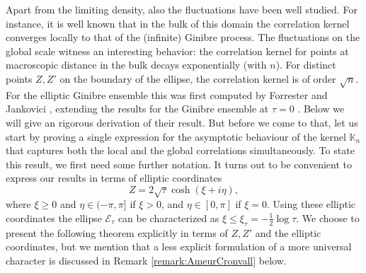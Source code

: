 \documentclass[%
 jmp,
cp,  %
 amsmath,amsthm,amssymb,%
 reprint,%
onecolumn]{revtex4-2}
\begin{document}
Apart from the limiting density, also the fluctuations have been well studied. For instance, it is  well known that in the bulk of this domain the correlation kernel converges locally to that of the (infinite) Ginibre process. The fluctuations on the global scale witness an interesting behavior: the correlation kernel for points at macroscopic distance in the bulk decays exponentially (with $n$). For distinct points $Z, Z'$ on the boundary of the ellipse, the correlation kernel is of order $\sqrt n$. For the elliptic Ginibre ensemble this was first computed by Forrester and Jankovici \cite{FoJa}, extending the results for the Ginibre ensemble at $\tau=0$ \cite{Choquard}. Below we will give an rigorous derivation of their result. 
But before we come to that, let us start by proving a  single expression for the asymptotic behaviour of the kernel $\mathbb K_n$ that captures both the local and the global correlations simultaneously.   To state this result, we  first need some further notation. It turns out to be convenient to express our results in terms of elliptic coordinates 
$$ 
  Z = 2 \sqrt{\tau} \cosh (\xi+i \eta),
$$
where $\xi \geq 0$ and $\eta \in (-\pi,\pi]$ if $\xi>0$, and $\eta \in [0,\pi]$ if $\xi=0$. Using these elliptic coordinates the ellipse $\mathcal E_\tau$ can be characterized as $\xi \leq \xi_\tau=-\frac12 \log \tau$. We choose to present the following theorem explicitly in terms of $Z, Z'$ and the elliptic coordinates, but we mention that a less explicit formulation of a more universal character is discussed in Remark \ref{remark:AmeurCronvall} below. 
  
\end{document}
